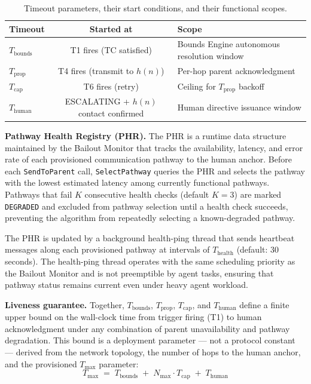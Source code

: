 \begin{table}[htbp]
\caption{Timeout parameters, their start conditions, and their functional scopes.}
\label{tab:bailout-timeouts}
\begin{tabular}{@{}lcl@{}}
\toprule
\textbf{Timeout} & \textbf{Started at} & \textbf{Scope} \\
\midrule
$T_{\text{bounds}}$ & T1 fires (TC satisfied) & Bounds Engine autonomous resolution window \\
$T_{\text{prop}}$ & T4 fires (transmit to $h(n)$) & Per-hop parent acknowledgment \\
$T_{\text{cap}}$ & T6 fires (retry) & Ceiling for $T_{\text{prop}}$ backoff \\
$T_{\text{human}}$ & ESCALATING + $h(n)$ contact confirmed & Human directive issuance window \\
\bottomrule
\end{tabular}
\end{table}

\bigskip
\noindent\textbf{Pathway Health Registry (PHR).} The PHR is a runtime data structure maintained by the Bailout Monitor that tracks the availability, latency, and error rate of each provisioned communication pathway to the human anchor. Before each \texttt{SendToParent} call, \texttt{SelectPathway} queries the PHR and selects the pathway with the lowest estimated latency among currently functional pathways. Pathways that fail $K$ consecutive health checks (default $K = 3$) are marked \texttt{DEGRADED} and excluded from pathway selection until a health check succeeds, preventing the algorithm from repeatedly selecting a known-degraded pathway.

The PHR is updated by a background health-ping thread that sends heartbeat messages along each provisioned pathway at intervals of $T_{\text{health}}$ (default: 30 seconds). The health-ping thread operates with the same scheduling priority as the Bailout Monitor and is not preemptible by agent tasks, ensuring that pathway status remains current even under heavy agent workload.

\bigskip
\noindent\textbf{Liveness guarantee.} Together, $T_{\text{bounds}}$, $T_{\text{prop}}$, $T_{\text{cap}}$, and $T_{\text{human}}$ define a finite upper bound on the wall-clock time from trigger firing (T1) to human acknowledgment under any combination of parent unavailability and pathway degradation. This bound is a deployment parameter — not a protocol constant — derived from the network topology, the number of hops to the human anchor, and the provisioned $T_{\max}$ parameter:
\begin{equation}
T_{\max} \;=\; T_{\text{bounds}} \;+\; N_{\max} \cdot T_{\text{cap}} \;+\; T_{\text{human}} \tag{T-max}
\end{equation}

